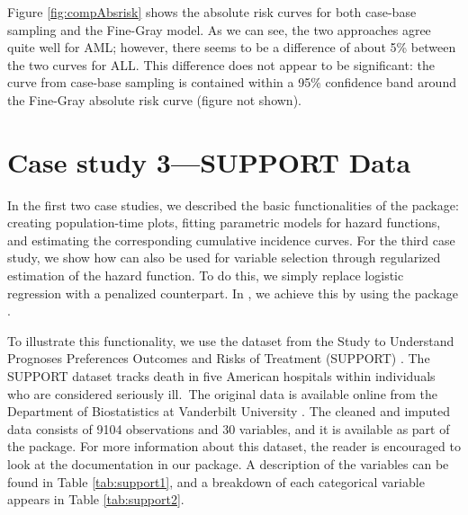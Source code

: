 \documentclass[
]{jss}
\begin{document}
Figure \ref{fig:compAbsrisk} shows the absolute risk curves for both
case-base sampling and the Fine-Gray model. As we can see, the two
approaches agree quite well for AML; however, there seems to be a
difference of about 5\% between the two curves for ALL. This difference
does not appear to be significant: the curve from case-base sampling is
contained within a 95\% confidence band around the Fine-Gray absolute
risk curve (figure not shown).

\hypertarget{case-study-3support-data}{%
\section{Case study 3---SUPPORT Data}\label{case-study-3support-data}}

In the first two case studies, we described the basic functionalities of
the  package: creating population-time plots, fitting
parametric models for hazard functions, and estimating the corresponding
cumulative incidence curves. For the third case study, we show how
 can also be used for variable selection through
regularized estimation of the hazard function. To do this, we simply
replace logistic regression with a penalized counterpart. In
, we achieve this by using the  package
\citep{friedman2010jss}.

To illustrate this functionality, we use the dataset from the Study to
Understand Prognoses Preferences Outcomes and Risks of Treatment
(SUPPORT) \citep{knaus1995support}. The SUPPORT dataset tracks death in
five American hospitals within individuals who are considered seriously
ill.~The original data is available online from the Department of
Biostatistics at Vanderbilt University \citep{harrell_2020}. The cleaned
and imputed data consists of 9104 observations and 30 variables, and it
is available as part of the  package. For more information
about this dataset, the reader is encouraged to look at the
documentation in our package. A description of the variables can be
found in Table \ref{tab:support1}, and a breakdown of each categorical
variable appears in Table \ref{tab:support2}.
\end{document}
